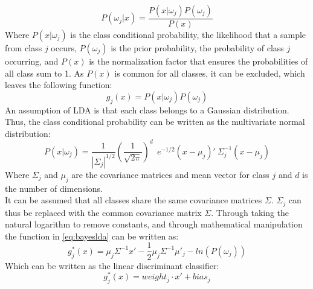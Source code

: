\begin{equation}
	P(\omega_{j}|x) = \frac{P(x|\omega_{j})P(\omega_{j})}{P(x)}
\end{equation}
\vspace{-0.02cm}
\noindent Where $P(x|\omega_{j})$ is the class conditional probability, the likelihood that a sample from class $j$ occurs, $P(\omega_{j})$ is the prior probability, the probability of class $j$ occurring, and $P(x)$ is the normalization factor that ensures the probabilities of all class sum to 1. As $P(x)$ is common for all classes, it can be excluded, which leaves the following function:
\vspace{-0.05cm}
\begin{equation} \label{eq:bayeslda}
	g_{j}(x) = P(x|\omega_{j})P(\omega_{j})
\end{equation} 
\vspace{-0.02cm}
\noindent An assumption of LDA is that each class belongs to a Gaussian distribution. Thus, the class conditional probability can be written as the multivariate normal distribution:
\vspace{-0.05cm}
\begin{equation}
P(x|\omega_{j}) = \frac{1}{|\varSigma_{j}|^{1/2}}(\frac{1}{\sqrt{2\pi}})^{d} ~~e^{-1/2} (x-\mu_{j})' ~\varSigma^{-1}_{j} (x-\mu_{j})
\end{equation} 
\vspace{-0.05cm}
\noindent Where $\varSigma_{j}$ and $\mu_{j}$ are the covariance matrices and mean vector for class $j$ and $d$ is the number of dimensions. \\
It can be assumed that all classes share the same covariance matrices $\varSigma$. $\varSigma_{j}$ can thus be replaced with the common covariance matrix $\varSigma$. Through taking the natural logarithm to remove constants, and through mathematical manipulation the function in \eqref{eq:bayeslda} can be written as:
\vspace{-0.05cm}
\begin{equation} 
	g_{j}^{*}(x) = \mu_{j}\varSigma^{-1}x' - \frac{1}{2}\mu_{j}\varSigma^{-1}\mu'_{j} - ln(P(\omega_{j}))
\end{equation}
\vspace{-0.01cm}
\noindent Which can be written as the linear discriminant classifier:
\vspace{-0.05cm}
\begin{equation} \label{eq:ldclassifier}
	g_{j}^{*}(x) = weight_{j}\cdot x' + bias_{j}
\end{equation}
\vspace{-0.1cm}
